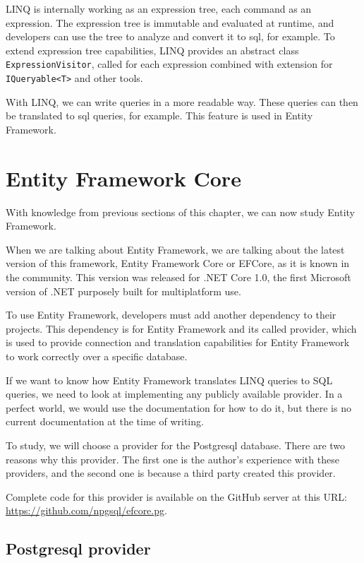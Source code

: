 LINQ is internally working as an expression tree, each command as an expression. The expression tree is immutable and evaluated at runtime, and developers
can use the tree to analyze and convert it to \acrshort{sql}, for example. To extend expression tree capabilities, LINQ provides an abstract class \texttt{ExpressionVisitor},
called for each expression combined with extension for \texttt{IQueryable<T>} and other tools.


With LINQ, we can write queries in a more readable way. These queries can then be translated to \acrshort{sql} queries, for example.
This feature is used in Entity Framework.

\section {Entity Framework Core}

With knowledge from previous sections of this chapter, we can now study Entity Framework.

When we are talking about Entity Framework, we are talking about the latest version of this framework, Entity Framework Core or EFCore, as it is known in the community.
This version was released for .NET Core 1.0, the first Microsoft version of .NET purposely built for multiplatform use.

To use Entity Framework, developers must add another dependency to their projects. This dependency is for Entity Framework and its called provider, which is used
to provide connection and translation capabilities for Entity Framework to work correctly over a specific database.

If we want to know how Entity Framework translates LINQ queries to SQL queries, we need to look at implementing any publicly available provider.
In a perfect world, we would use the documentation for how to do it, but there is no current documentation at the time of writing.

To study, we will choose a provider for the Postgresql database. There are two reasons why this provider. The first one is the author's experience with these providers, and the second one
is because a third party created this provider.

Complete code for this provider is available on the GitHub server at this URL: \url{https://github.com/npgsql/efcore.pg}.

\subsection {Postgresql provider}


